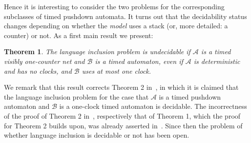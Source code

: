 \documentclass{CSML}
\theoremstyle{plain}\newtheorem{theorem}[thm]{Theorem}
\theoremstyle{plain}\newtheorem{corollary}[thm]{Corollary}
\theoremstyle{plain}\newtheorem{example}[thm]{Example}
\theoremstyle{plain}\newtheorem{lemma}[thm]{Lemma}
\theoremstyle{plain}\newtheorem{remark}[thm]{Remark}
\newcommand{\B}{\mathcal{B}}
\newcommand{\A}{\mathcal{A}}
\begin{document}
	Hence it is interesting to consider the two problems for the corresponding subclasses of timed pushdown automata.
	It turns out that the decidability status changes depending on whether the \emph{model} uses a stack (or, more detailed: a counter) or not.
	As a first main result we present:
	\begin{theorem}
		\label{theorem_main_lang_inc}
		The language inclusion problem is undecidable if $\A$ is a timed visibly one-counter net and $\B$ is a timed automaton, even if $\A$ is deterministic and has no clocks, and $\B$ uses at most one clock. 
	\end{theorem}
	We remark that this result corrects Theorem 2 in~\cite{EmmiM06}, in which it is claimed that the language inclusion problem for the case that $\A$ is a timed pushdown automaton and $\B$ is a one-clock timed automaton is decidable.
	The incorrectness of the proof of Theorem 2 in~\cite{EmmiM06}, respectively that of Theorem 1, which the proof for Theorem 2 builds upon,  was already asserted in~\cite{DBLP:conf/concur/ChadhaV07}. Since then the problem of whether language inclusion is decidable or not has been open. 
	
\end{document}
